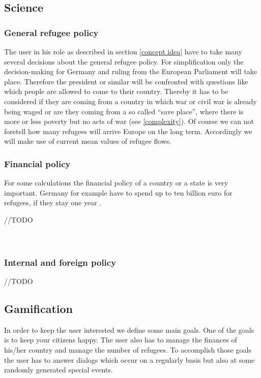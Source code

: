 \documentclass{acm_proc_article-sp}
\begin{document}
\subsection{Science}
\subsubsection*{\textbf{General refugee policy}}
The user in his role as described in section \ref{concept idea} have to take many several decisions about the general refugee policy. For simplification only the decision-making for Germany and ruling from the European Parliament will take place. Therefore the president or similar will be confronted with questions like which people are allowed to come to their country. Thereby it has to be considered if they are coming from a country in which war or civil war is already being waged or are they coming from a so called ``save place'', where there is more or less poverty but no acts of war (see \ref{complexity}). Of course we can not foretell how many refugees will arrive Europe on the long term. Accordingly we will make use of current mean values of refugee flows. 


\subsubsection*{\textbf{Financial policy}}
For some calculations the financial policy of a country or a state is very important. Germany for example have to spend up to ten billion euro for refugees, if they stay one year \cite{finanzen}. 

//TODO
\\
\\
\\

\subsubsection*{\textbf{Internal and foreign policy}} //TODO



\subsection{Gamification}
\label{gamification}
In order to keep the user interested we define some main goals. One of the goals is to keep your citizens happy. The user also has to manage the finances of his/her country and manage the number of refugees. To accomplish those goals the user has to answer dialogs which occur on a regularly basis but also at some randomly generated special events. 
\end{document}
